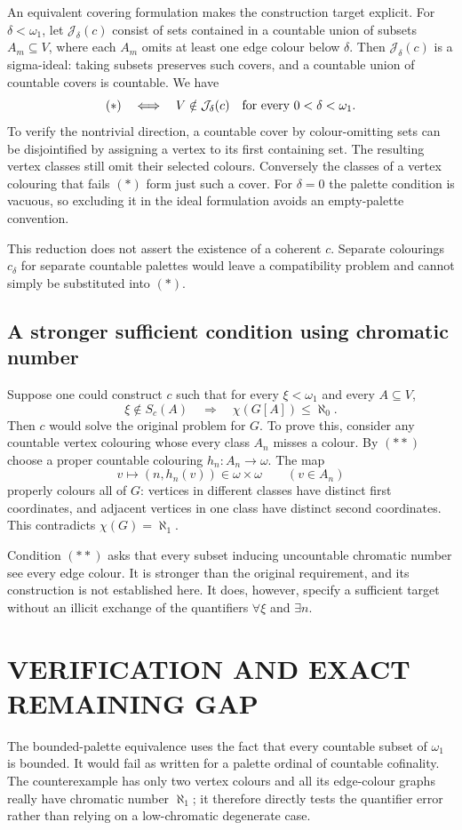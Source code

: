 An equivalent covering formulation makes the construction target explicit. For $\delta<\omega_1$, let $\mathcal J_\delta(c)$ consist of sets contained in a countable union of subsets $A_m\subseteq V$, where each $A_m$ omits at least one edge colour below $\delta$. Then $\mathcal J_\delta(c)$ is a sigma-ideal: taking subsets preserves such covers, and a countable union of countable covers is countable. We have
\[
(*)\quad\Longleftrightarrow\quad
V\notin\mathcal J_\delta(c)\quad\hbox{for every }0<\delta<\omega_1.
\]
To verify the nontrivial direction, a countable cover by colour-omitting sets can be disjointified by assigning a vertex to its first containing set. The resulting vertex classes still omit their selected colours. Conversely the classes of a vertex colouring that fails $(*)$ form just such a cover. For $\delta=0$ the palette condition is vacuous, so excluding it in the ideal formulation avoids an empty-palette convention.

This reduction does not assert the existence of a coherent $c$. Separate colourings $c_\delta$ for separate countable palettes would leave a compatibility problem and cannot simply be substituted into $(*)$.

\subsection{A stronger sufficient condition using chromatic number}
Suppose one could construct $c$ such that for every $\xi<\omega_1$ and every $A\subseteq V$,
\[
\xi\notin S_c(A)\quad\Longrightarrow\quad\chi(G[A])\le\aleph_0.\tag{**}
\]
Then $c$ would solve the original problem for $G$. To prove this, consider any countable vertex colouring whose every class $A_n$ misses a colour. By $(**)$ choose a proper countable colouring $h_n:A_n\to\omega$. The map
\[
v\longmapsto(n,h_n(v))\in\omega\times\omega\qquad(v\in A_n)
\]
properly colours all of $G$: vertices in different classes have distinct first coordinates, and adjacent vertices in one class have distinct second coordinates. This contradicts $\chi(G)=\aleph_1$.

Condition $(**)$ asks that every subset inducing uncountable chromatic number see every edge colour. It is stronger than the original requirement, and its construction is not established here. It does, however, specify a sufficient target without an illicit exchange of the quantifiers $\forall\xi$ and $\exists n$.

\section{VERIFICATION AND EXACT REMAINING GAP}
The bounded-palette equivalence uses the fact that every countable subset of $\omega_1$ is bounded. It would fail as written for a palette ordinal of countable cofinality. The counterexample has only two vertex colours and all its edge-colour graphs really have chromatic number $\aleph_1$; it therefore directly tests the quantifier error rather than relying on a low-chromatic degenerate case.

